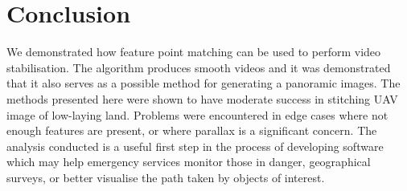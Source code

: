 \section{Conclusion}

We demonstrated how feature point matching can be used to perform video stabilisation.
The algorithm produces smooth videos and it was demonstrated that it also serves as a possible method for generating a panoramic images.
The methods presented here were shown to have moderate success in stitching UAV image of low-laying land.
Problems were encountered in edge cases where not enough features are present,
or where parallax is a significant concern.
The analysis conducted is a useful first step in the process of developing software which may help emergency services monitor those in danger, geographical surveys, or better visualise the path taken by objects of interest.

